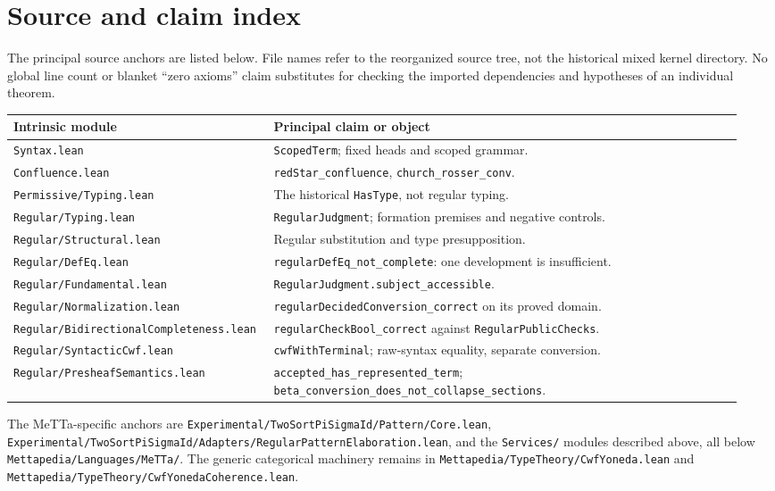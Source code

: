 \documentclass[11pt]{article}
\newcommand{\code}[1]{\nolinkurl{#1}}
\begin{document}
\clearpage
\section{Source and claim index}

The principal source anchors are listed below. File names refer to the
reorganized source tree, not the historical mixed kernel directory.
No global line count or blanket “zero axioms” claim substitutes for checking
the imported dependencies and hypotheses of an individual theorem.

\small
\begin{longtable}{@{}p{0.32\linewidth}p{0.63\linewidth}@{}}
\toprule
Intrinsic module & Principal claim or object \\
\midrule
\endhead
\code{Syntax.lean} &
\code{ScopedTerm}; fixed heads and scoped grammar. \\
\code{Confluence.lean} &
\code{redStar_confluence}, \code{church_rosser_conv}. \\
\code{Permissive/Typing.lean} &
The historical \code{HasType}, not regular typing. \\
\code{Regular/Typing.lean} &
\code{RegularJudgment}; formation premises and negative controls. \\
\code{Regular/Structural.lean} &
Regular substitution and type presupposition. \\
\code{Regular/DefEq.lean} &
\code{regularDefEq_not_complete}: one development is insufficient. \\
\code{Regular/Fundamental.lean} &
\code{RegularJudgment.subject_accessible}. \\
\code{Regular/Normalization.lean} &
\code{regularDecidedConversion_correct} on its proved domain. \\
\code{Regular/BidirectionalCompleteness.lean} &
\code{regularCheckBool_correct} against \code{RegularPublicChecks}. \\
\code{Regular/SyntacticCwf.lean} &
\code{cwfWithTerminal}; raw-syntax equality, separate conversion. \\
\code{Regular/PresheafSemantics.lean} &
\code{accepted_has_represented_term};
\code{beta_conversion_does_not_collapse_sections}. \\
\bottomrule
\end{longtable}
\normalsize

The MeTTa-specific anchors are
\code{Experimental/TwoSortPiSigmaId/Pattern/Core.lean},
\code{Experimental/TwoSortPiSigmaId/Adapters/RegularPatternElaboration.lean},
and the \code{Services/} modules described above, all below
\code{Mettapedia/Languages/MeTTa/}.
The generic categorical machinery remains in
\code{Mettapedia/TypeTheory/CwfYoneda.lean} and
\code{Mettapedia/TypeTheory/CwfYonedaCoherence.lean}.
\end{document}
